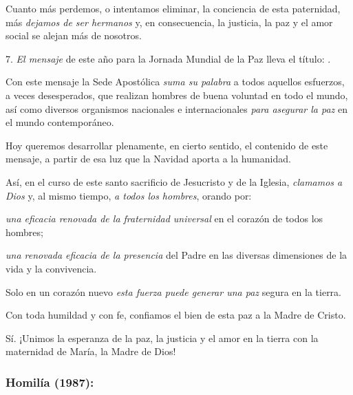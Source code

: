\begin{body}
	Cuanto más perdemos, o intentamos eliminar, la conciencia de esta paternidad, más \emph{dejamos de ser hermanos} y, en consecuencia, la justicia, la paz y el amor social se alejan más de nosotros.
	
	7. \emph{El mensaje} de este año para la Jornada Mundial de la Paz lleva el título: .
	
	Con este mensaje la Sede Apostólica \emph{suma su palabra} a todos aquellos esfuerzos, a veces desesperados, que realizan hombres de buena voluntad en todo el mundo, así como diversos organismos nacionales e internacionales \emph{para asegurar la paz} en el mundo contemporáneo.
	
	Hoy queremos desarrollar plenamente, en cierto sentido, el contenido de este mensaje, a partir de esa luz que la Navidad aporta a la humanidad.
	
	Así, en el curso de este santo sacrificio de Jesucristo y de la Iglesia, \emph{clamamos a Dios} y, al mismo tiempo, \emph{a todos los hombres}, orando por:
	
	\emph{una eficacia renovada de la fraternidad universal} en el corazón de todos los hombres;
	
	\emph{una renovada eficacia de la presencia} del Padre en las diversas dimensiones de la vida y la convivencia.
	
	Solo en un corazón nuevo \emph{esta fuerza puede generar una paz} segura en la tierra.
	
	Con toda humildad y con fe, confiamos el bien de esta paz a la Madre de Cristo.
	
	Sí. ¡Unimos la esperanza de la paz, la justicia y el amor en la tierra con la maternidad de María, la Madre de Dios!
\end{body}

\subsubsection{Homilía (1987):}

